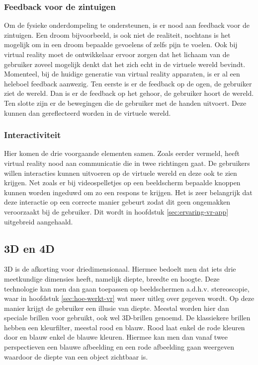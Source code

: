 \subsubsection{Feedback voor de zintuigen}
\label{ssubsec:feedback-van-zintuigen}
Om de fysieke onderdompeling te ondersteunen, is er nood aan feedback voor de zintuigen. Een droom bijvoorbeeld, is ook niet de realiteit, nochtans is het mogelijk om in een droom bepaalde gevoelens of zelfs pijn te voelen. Ook bij virtual reality moet de ontwikkelaar ervoor zorgen dat het lichaam van de gebruiker zoveel mogelijk denkt dat het zich echt in de virtuele wereld bevindt. Momenteel, bij de huidige generatie van virtual reality apparaten, is er al een heleboel feedback aanwezig. Ten eerste is er de feedback op de ogen, de gebruiker ziet de wereld. Dan is er de feedback op het gehoor, de gebruiker hoort de wereld. Ten slotte zijn er de bewegingen die de gebruiker met de handen uitvoert. Deze kunnen dan gereflecteerd worden in de virtuele wereld.

\subsubsection{Interactiviteit}
\label{ssubsec:interactiviteit}
Hier komen de drie voorgaande elementen samen. Zoals eerder vermeld, heeft virtual reality nood aan communicatie die in twee richtingen gaat. De gebruikers willen interacties kunnen uitvoeren op de virtuele wereld en deze ook te zien krijgen. Net zoals er bij videospelletjes op een beeldscherm bepaalde knoppen kunnen worden ingeduwd om zo een respons te krijgen. Het is zeer belangrijk dat deze interactie op een correcte manier gebeurt zodat dit geen ongemakken veroorzaakt bij de gebruiker. Dit wordt in hoofdstuk \ref{sec:ervaring-vr-app} uitgebreid aangehaald.

\subsection{3D en 4D}
\label{subsec:3d-4d}
3D is de afkorting voor driedimensionaal. Hiermee bedoelt men dat iets drie meetkundige dimensies heeft, namelijk diepte, breedte en hoogte. Deze technologie kan men dan gaan toepassen op beeldschermen a.d.h.v. stereoscopie, waar in hoofdstuk \ref{sec:hoe-werkt-vr} wat meer uitleg over gegeven wordt. Op deze manier krijgt de gebruiker  een illusie van diepte. Meestal worden hier dan speciale brillen voor gebruikt, ook wel 3D-brillen genoemd. De klassiekere brillen hebben een kleurfilter, meestal rood en blauw. Rood laat enkel de rode kleuren door en blauw enkel de blauwe kleuren. Hiermee kan men dan vanaf twee perspectieven een blauwe afbeelding en een rode afbeelding gaan weergeven waardoor de diepte van een object zichtbaar is.

